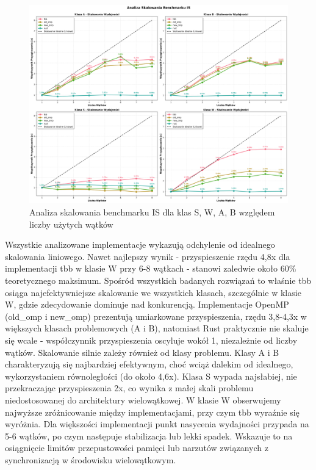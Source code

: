 \begin{figure}[H]
    \centering
    \includegraphics[width=\textwidth]{analiza/images/parallel/is/x86/is_analiza_skalowania.png}
    \caption{Analiza skalowania benchmarku IS dla klas S, W, A, B względem liczby użytych wątków}
    \label{is_analiza_skalowania_x86}
\end{figure}
Wszystkie analizowane implementacje wykazują odchylenie od idealnego skalowania liniowego. Nawet najlepszy wynik - przyspieszenie rzędu 4,8x dla implementacji tbb w klasie W przy 6-8 wątkach - stanowi zaledwie około 60\% teoretycznego maksimum. Spośród wszystkich badanych rozwiązań to właśnie tbb osiąga najefektywniejsze skalowanie we wszystkich klasach, szczególnie w klasie W, gdzie zdecydowanie dominuje nad konkurencją. Implementacje OpenMP (old\_omp i new\_omp) prezentują umiarkowane przyspieszenia, rzędu 3,8-4,3x w większych klasach problemowych (A i B), natomiast Rust praktycznie nie skaluje się wcale - współczynnik przyspieszenia oscyluje wokół 1, niezależnie od liczby wątków. Skalowanie silnie zależy również od klasy problemu. Klasy A i B charakteryzują się najbardziej efektywnym, choć wciąż dalekim od idealnego, wykorzystaniem równoległości (do około 4,6x). Klasa S wypada najsłabiej, nie przekraczając przyspieszenia 2x, co wynika z małej skali problemu niedostosowanej do architektury wielowątkowej. W klasie W obserwujemy najwyższe zróżnicowanie między implementacjami, przy czym tbb wyraźnie się wyróżnia. Dla większości implementacji punkt nasycenia wydajności przypada na 5-6 wątków, po czym następuje stabilizacja lub lekki spadek. Wskazuje to na osiągnięcie limitów przepustowości pamięci lub narzutów związanych z synchronizacją w środowisku wielowątkowym.

